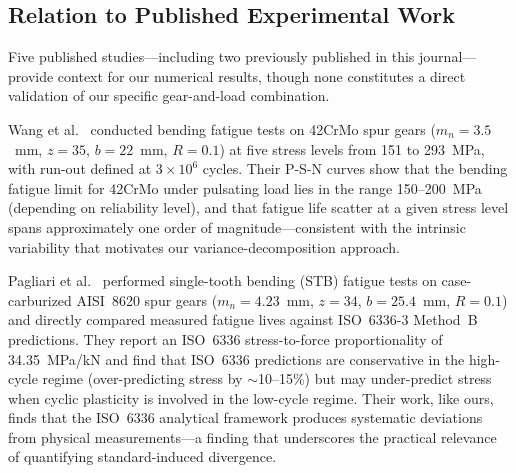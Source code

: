 \documentclass[12pt,a4paper]{article}
\begin{document}
\subsection{Relation to Published Experimental Work}

Five published studies---including two previously published in
this journal---provide context for our numerical results, though
none constitutes a direct validation of our specific
gear-and-load combination.

Wang et al.~\cite{wang2023} conducted bending fatigue tests on 42CrMo
spur gears ($m_n{=}3.5$~mm, $z{=}35$, $b{=}22$~mm, $R{=}0.1$) at five
stress levels from 151 to 293~MPa, with run-out defined at $3\times10^6$
cycles. Their P-S-N curves show that the bending fatigue limit for
42CrMo under pulsating load lies in the range 150--200~MPa (depending on
reliability level), and that fatigue life scatter at a given stress level
spans approximately one order of magnitude---consistent with the
intrinsic variability that motivates our variance-decomposition approach.

Pagliari et al.~\cite{pagliari2025} performed single-tooth bending (STB)
fatigue tests on case-carburized AISI~8620 spur gears
($m_n{=}4.23$~mm, $z{=}34$, $b{=}25.4$~mm, $R{=}0.1$) and directly
compared measured fatigue lives against ISO~6336-3 Method~B predictions.
They report an ISO~6336 stress-to-force proportionality of
34.35~MPa/kN and find that ISO~6336 predictions are conservative in the
high-cycle regime (over-predicting stress by $\sim$10--15\%) but may
under-predict stress when cyclic plasticity is involved in the low-cycle
regime. Their work, like ours, finds that the ISO~6336 analytical
framework produces systematic deviations from physical measurements---a
finding that underscores the practical relevance of quantifying
standard-induced divergence.
\end{document}
